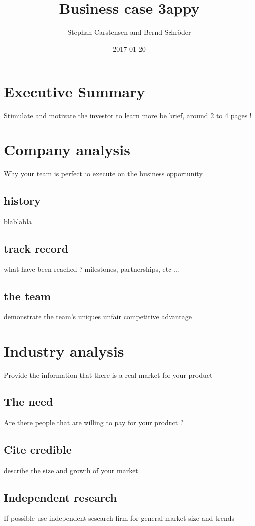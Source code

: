\documentclass{article}
\title{Business case 3appy}
\date{2017-01-20}
\author{Stephan Carstensen and Bernd Schröder}
\begin{document}
\maketitle
\newpage

\section{Executive Summary}
Stimulate and motivate the investor to learn more
be brief, around 2 to 4 pages !

\newpage
{}

\section{Company analysis}
Why your team is perfect to execute on the business opportunity

\subsection{history}
blablabla

\subsection{track record}
what have been reached ? milestones, partnerships, etc ...

\subsection{the team}
demonstrate the team's uniques unfair competitive advantage

\section{Industry analysis}
Provide the information that there is a real market for your product

\subsection{The need}
Are there people that are willing to pay for your product ?

\subsection{Cite credible}
describe the size and growth of your market

\subsection{Independent research}
If possible use independent sesearch firm for general market size and trends
\end{document}
